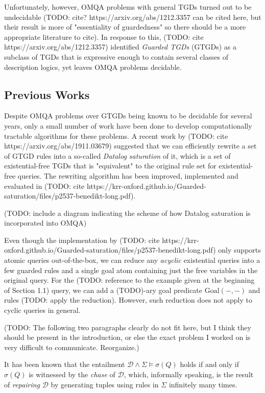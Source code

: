 \documentclass[12pt]{article}
\begin{document}
Unfortunately, however, OMQA problems with general TGDs turned out to be undecidable (TODO: cite? https://arxiv.org/abs/1212.3357 can be cited here, but their result is more of "essentiality of guardedness" so there should be a more appropriate literature to cite). In response to this, (TODO: cite https://arxiv.org/abs/1212.3357) identified \emph{Guarded TGDs} (GTGDs) as a subclass of TGDs that is expressive enough to contain several classes of description logics, yet leaves OMQA problems decidable.

\subsection{Previous Works}

Despite OMQA problems over GTGDs being known to be decidable for several years, only a small number of work have been done to develop computationally tractable algorithms for these problems. A recent work by (TODO: cite https://arxiv.org/abs/1911.03679) suggested that we can efficiently rewrite a set of GTGD rules into a so-called \emph{Datalog saturation} of it, which is a set of existential-free TGDs that is "equivalent" to the original rule set for existential-free queries. The rewriting algorithm has been improved, implemented and evaluated in (TODO: cite https://krr-oxford.github.io/Guarded-saturation/files/p2537-benedikt-long.pdf). 

(TODO: include a diagram indicating the scheme of how Datalog saturation is incorporated into OMQA)

Even though the implementation by (TODO: cite https://krr-oxford.github.io/Guarded-saturation/files/p2537-benedikt-long.pdf) only supports atomic queries out-of-the-box, we can reduce any \emph{acyclic} existential queries into a few guarded rules and a single goal atom containing just the free variables in the original query. For the (TODO: reference to the example given at the beginning of Section 1.1) query, we can add a (TODO)-ary goal predicate $\mathrm{Goal}(-, -)$ and rules (TODO: apply the reduction). However, such reduction does not apply to cyclic queries in general.

(TODO: The following two paragraphs clearly do not fit here, but I think they should be present in the introduction, or else the exact problem I worked on is very difficult to communicate. Reorganize.)

It has been known that the entailment $\mathcal{D} \land \Sigma \models \sigma(Q)$ holds if and only if $\sigma(Q)$ is witnessed by the \emph{chase} of $\mathcal{D}$, which, informally speaking, is the result of \emph{repairing} $\mathcal{D}$ by generating tuples using rules in $\Sigma$ infinitely many times. %
\end{document}

